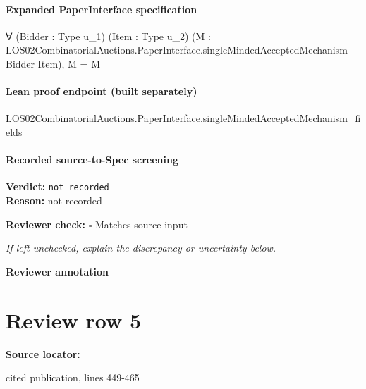 \documentclass[10pt]{article}
\newcommand{\reviewerbox}{%
  \par\noindent\fbox{\parbox{0.96\linewidth}{\rule{0pt}{0.38in}}}\par
}
\newcommand{\reviewmatch}[1]{%
  \par\noindent\textbf{Reviewer check:} $\square$\; #1\par
  \noindent\emph{If left unchecked, explain the discrepancy or uncertainty below.}\par
}
\begin{document}
\paragraph{Expanded PaperInterface specification}
\begin{ReviewVerbatim}
∀ (Bidder : Type u_1) (Item : Type u_2)
  (M : LOS02CombinatorialAuctions.PaperInterface.singleMindedAcceptedMechanism Bidder Item), M = M
\end{ReviewVerbatim}

\paragraph{Lean proof endpoint (built separately)}\begin{ReviewVerbatim}
LOS02CombinatorialAuctions.PaperInterface.singleMindedAcceptedMechanism_fields
\end{ReviewVerbatim}

\paragraph{Recorded source-to-Spec screening}
\textbf{Verdict:} \texttt{not recorded}
\\
\textbf{Reason:} not recorded
\reviewmatch{Matches source input}
\noindent\textbf{Reviewer annotation}\par
\reviewerbox
\clearpage
\hypertarget{source-claim-6f208bff80c2a325}{}
\section*{Review row 5}
\textbf{Source locator:} {\footnotesize\raggedright cited publication, lines 449-\allowbreak{}465\par}
\end{document}
